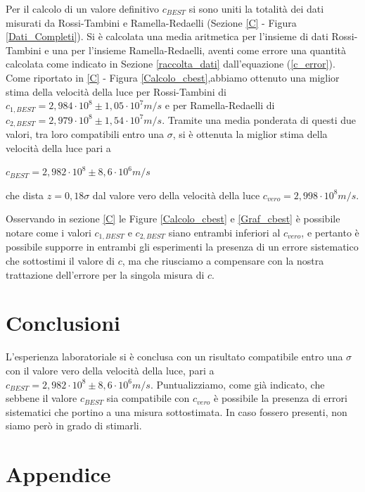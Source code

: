 \documentclass{article}
\begin{document}
Per il calcolo di un valore definitivo $c_{BEST}$ si sono uniti la totalità dei dati misurati da Rossi-Tambini e Ramella-Redaelli (Sezione \ref{C} - Figura 
\ref{Dati_Completi}). Si è calcolata una media aritmetica per l'insieme di dati Rossi-Tambini e una per l'insieme Ramella-Redaelli, aventi come errore una quantità
calcolata come indicato in Sezione \ref{raccolta_dati} dall'equazione (\ref{c_error}). Come riportato in \ref{C} - Figura \ref{Calcolo_cbest},abbiamo ottenuto una miglior stima della 
velocità della luce per Rossi-Tambini di $c_{1,BEST}=2,984\cdot10^8 \pm 1,05\cdot10^7 m/s$ e per Ramella-Redaelli di $c_{2,BEST}=2,979\cdot10^8\pm 1,54\cdot10^7 m/s$.
Tramite una media ponderata di questi due valori, tra loro compatibili entro una $\sigma$, si è ottenuta la miglior stima della velocità della luce pari a

\begin{center}
    $c_{BEST} = 2,982\cdot10^8 \pm 8,6 \cdot 10^6 m/s$
\end{center}
che dista $z=0,18\sigma$ dal valore vero della velocità della luce $c_{vero}=2,998\cdot10^8 m/s$.

Osservando in sezione \ref{C} le Figure \ref{Calcolo_cbest} e \ref{Graf_cbest} è possibile notare come i valori $c_{1,BEST}$ e $c_{2,BEST}$ siano entrambi
inferiori al $c_{vero}$, e pertanto è possibile supporre in entrambi gli esperimenti la presenza di un errore sistematico che sottostimi il valore di $c$, ma che riusciamo
a compensare con la nostra trattazione dell'errore per la singola misura di $c$.

\section{Conclusioni}

L'esperienza laboratoriale si è conclusa con un risultato compatibile entro una $\sigma$ con il valore vero della velocità della luce, pari a $c_{BEST} = 2,982 \cdot
10^8 \pm 8,6 \cdot 10^6 m/s$. Puntualizziamo, come già indicato, che sebbene il valore $c_{BEST}$ sia compatibile con $c_{vero}$ è possibile la presenza di errori 
sistematici che portino a una misura sottostimata. In caso fossero presenti, non siamo però in grado di stimarli.

\newpage

\section{Appendice}

\end{document}
